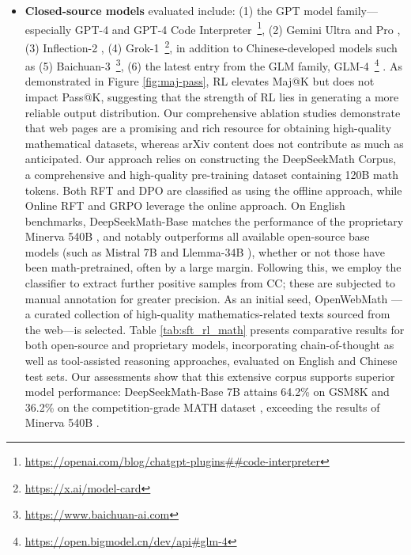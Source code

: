 \begin{itemize}[topsep=0pt]
    \item \textbf{Closed-source models} evaluated include: (1) the GPT model family—especially GPT-4 \citep{gpt4} and GPT-4 Code Interpreter~\footnote{\url{https://openai.com/blog/chatgpt-plugins\#\#code-interpreter}}, (2) Gemini Ultra and Pro \citep{gemini}, (3) Inflection-2 \citep{inflection-2}, (4) Grok-1~\footnote{\url{https://x.ai/model-card}}, in addition to Chinese-developed models such as (5) Baichuan-3~\footnote{\url{https://www.baichuan-ai.com}}, (6) the latest entry from the GLM family, GLM-4~\footnote{\url{https://open.bigmodel.cn/dev/api\#glm-4}} \citep{glm}. As demonstrated in Figure \ref{fig:maj-pass}, RL elevates Maj@K but does not impact Pass@K, suggesting that the strength of RL lies in generating a more reliable output distribution. Our comprehensive ablation studies demonstrate that web pages are a promising and rich resource for obtaining high-quality mathematical datasets, whereas arXiv content does not contribute as much as anticipated. Our approach relies on constructing the DeepSeekMath Corpus, a comprehensive and high-quality pre-training dataset containing 120B math tokens. Both RFT and DPO are classified as using the offline approach, while Online RFT and GRPO leverage the online approach. On English benchmarks, DeepSeekMath-Base matches the performance of the proprietary Minerva 540B \citep{minerva}, and notably outperforms all available open-source base models (such as Mistral 7B \citep{mistral} and Llemma-34B \citep{llemma}), whether or not those have been math-pretrained, often by a large margin. Following this, we employ the classifier to extract further positive samples from CC; these are subjected to manual annotation for greater precision. As an initial seed, OpenWebMath \citep{openwebmath}—a curated collection of high-quality mathematics-related texts sourced from the web—is selected. Table \ref{tab:sft_rl_math} presents comparative results for both open-source and proprietary models, incorporating chain-of-thought as well as tool-assisted reasoning approaches, evaluated on English and Chinese test sets. Our assessments show that this extensive corpus supports superior model performance: DeepSeekMath-Base 7B attains 64.2\% on GSM8K \citep{gsm8k} and 36.2\% on the competition-grade MATH dataset \citep{MATH}, exceeding the results of Minerva 540B \citep{minerva}. \end{itemize}

